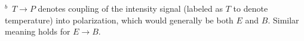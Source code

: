 \begin{table}[h!]
 {$^{b}$}~$T \rightarrow P $ denotes coupling of the intensity signal (labeled as $T$ to denote temperature) into polarization, which would generally be both $E$ and $B$. Similar meaning holds for $E \rightarrow B$.\par
\end{table}



